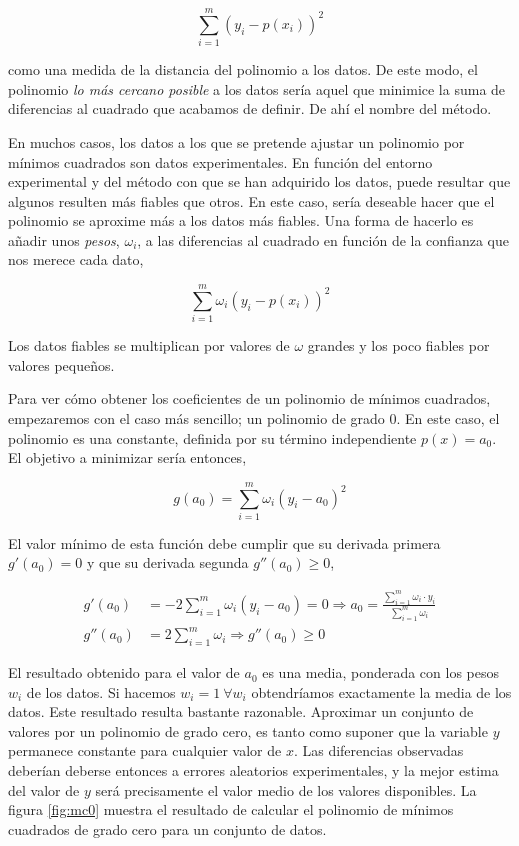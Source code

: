 \begin{equation*}
\sum_{i=1}^m \left(y_i-p(x_i)\right)^2
\end{equation*}

como una medida de la distancia del polinomio a los datos.  De este modo,  el polinomio \emph{lo más cercano posible}  a los datos sería aquel que minimice la suma de diferencias al cuadrado que acabamos de definir. De ahí el nombre del método.

En muchos casos, los datos a los que se pretende ajustar un polinomio por mínimos cuadrados son datos experimentales. En función del entorno experimental y del método con que se han adquirido los datos, puede resultar que algunos resulten más fiables que otros. En este caso, sería deseable hacer que el polinomio se aproxime más a los datos más fiables. Una forma de hacerlo es añadir unos \emph{pesos}, $\omega_i$, a las diferencias al  cuadrado en función de la confianza que nos merece cada dato,

\begin{equation*}
\sum_{i=1}^m \omega_i \left(y_i-p(x_i)\right)^2
\end{equation*}

Los datos fiables se multiplican por valores de $\omega$ grandes y los poco fiables por valores pequeños.

Para ver cómo obtener los coeficientes de un polinomio de mínimos cuadrados, empezaremos con el caso más sencillo; un polinomio de grado $0$. En este caso, el polinomio es una constante, definida por su término independiente $p(x)=a_0$. El objetivo a minimizar sería entonces,

\begin{equation*}
g(a_0)=\sum_{i=1}^m \omega_i \left(y_i-a_0\right)^2
\end{equation*}

El valor mínimo de esta función debe cumplir que su derivada primera $g'(a_0)=0$ y que su derivada segunda  $g''(a_0)\geq 0$,

\begin{align*}
g'(a_0)&=-2\sum_{i=1}^m \omega_i \left(y_i-a_0\right)=0 \Rightarrow a_0=\frac{\sum_{i=1}^m \omega_i\cdot y_i}{ \sum_{i=1}^m \omega_i}\\
g''(a_0)&=2\sum_{i=1}^m \omega_i \Rightarrow  g''(a_0) \geq 0
\end{align*}

El resultado obtenido para el valor de $a_0$ es una media, ponderada con los pesos $w_i$ de los datos. Si hacemos $w_i=1 \ \forall w_i$ obtendríamos exactamente la media de los datos. Este resultado resulta bastante razonable. Aproximar un conjunto de valores por un polinomio de grado cero, es tanto como suponer que la variable $y$ permanece constante para cualquier valor de $x$. Las diferencias observadas deberían deberse entonces a errores aleatorios experimentales, y la mejor estima del valor de $y$ será precisamente el valor medio de los valores disponibles. La figura \ref{fig:mc0} muestra el resultado de  calcular el polinomio de mínimos cuadrados de grado cero para un conjunto de datos.

